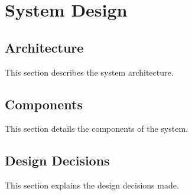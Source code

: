 \chapter{System Design}
\label{chap:system_design}

\section{Architecture}
This section describes the system architecture.

\section{Components}
This section details the components of the system.

\section{Design Decisions}
This section explains the design decisions made.
